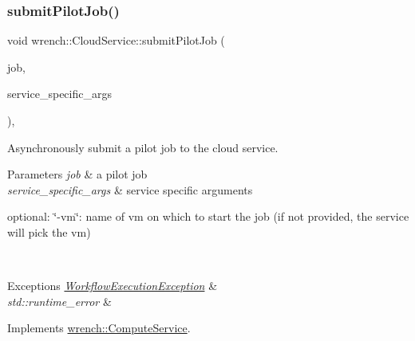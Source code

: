 \subsubsection{\texorpdfstring{submit\+Pilot\+Job()}{submitPilotJob()}}
{\footnotesize\ttfamily void wrench\+::\+Cloud\+Service\+::submit\+Pilot\+Job (\begin{DoxyParamCaption}\item[{\hyperlink{classwrench_1_1_pilot_job}{Pilot\+Job} $\ast$}]{job,  }\item[{std\+::map$<$ std\+::string, std\+::string $>$ \&}]{service\+\_\+specific\+\_\+args }\end{DoxyParamCaption})\hspace{0.3cm}{\ttfamily [override]}, {\ttfamily [virtual]}}



Asynchronously submit a pilot job to the cloud service. 


\begin{DoxyParams}{Parameters}
{\em job} & a pilot job \\
\hline
{\em service\+\_\+specific\+\_\+args} & service specific arguments
\begin{DoxyItemize}
\item optional\+: \char`\"{}-\/vm\char`\"{}\+: name of vm on which to start the job (if not provided, the service will pick the vm)
\end{DoxyItemize}\\
\hline
\end{DoxyParams}

\begin{DoxyExceptions}{Exceptions}
{\em \hyperlink{classwrench_1_1_workflow_execution_exception}{Workflow\+Execution\+Exception}} & \\
\hline
{\em std\+::runtime\+\_\+error} & \\
\hline
\end{DoxyExceptions}


Implements \hyperlink{classwrench_1_1_compute_service}{wrench\+::\+Compute\+Service}.

\mbox{\label{classwrench_1_1_cloud_service_ae51ffa7f8e75d1834a193b91cb376b9a}} 
